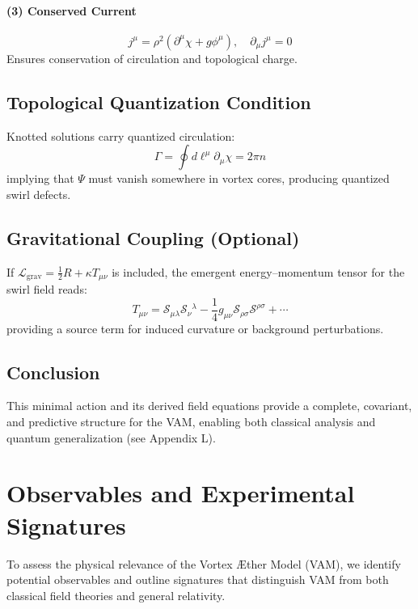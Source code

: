 \documentclass[a4paper,12pt]{article}
\begin{document}
        \paragraph{(3) Conserved Current}
        \begin{equation}
            j^\mu = \rho^2 (\partial^\mu \chi + g \phi^\mu), \quad \partial_\mu j^\mu = 0
        \end{equation}
        Ensures conservation of circulation and topological charge.

        \subsection{Topological Quantization Condition}
        Knotted solutions carry quantized circulation:
        \begin{equation}
            \Gamma = \oint d\ell^\mu \partial_\mu \chi = 2\pi n
        \end{equation}
        implying that $\Psi$ must vanish somewhere in vortex cores, producing quantized swirl defects.

        \subsection{Gravitational Coupling (Optional)}
        If $\mathcal{L}_{\text{grav}} = \frac{1}{2} R + \kappa T_{\mu\nu}$ is included, the emergent energy--momentum tensor for the swirl field reads:
        \begin{equation}
            T_{\mu\nu} = \mathcal{S}_{\mu\lambda} \mathcal{S}_\nu{}^\lambda - \frac{1}{4} g_{\mu\nu} \mathcal{S}_{\rho\sigma} \mathcal{S}^{\rho\sigma} + \cdots
        \end{equation}
        providing a source term for induced curvature or background perturbations.

        \subsection{Conclusion}
        This minimal action and its derived field equations provide a complete, covariant, and predictive structure for the VAM, enabling both classical analysis and quantum generalization (see Appendix L).

        \section*{Observables and Experimental Signatures}
        To assess the physical relevance of the Vortex Æther Model (VAM), we identify potential observables and outline signatures that distinguish VAM from both classical field theories and general relativity.
\end{document}
